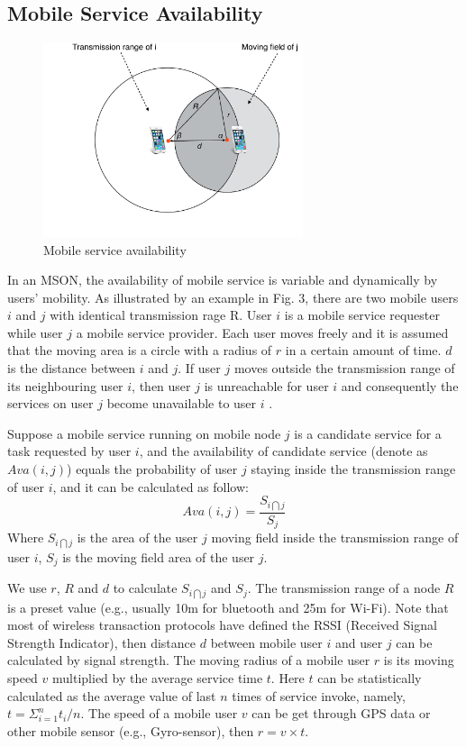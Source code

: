 \documentclass[10pt,journal,compsoc]{IEEEtran}
\begin{document}
\subsection{Mobile Service Availability}
\begin{figure}[!t]
\centering
\includegraphics[width=3in]{./img/pic3.pdf}
\caption{Mobile service availability}
\label{fig_sd}
\end{figure}
In an MSON, the availability of mobile service is variable and dynamically by users' mobility. 
As illustrated by an example in Fig. 3, there are two mobile users $i$ and $j$ with identical transmission rage R. User $i$ is a mobile service requester while user $j$ a mobile service provider. Each user moves freely and it is assumed that the moving area is a circle with a radius of $r$ in a certain amount of time. $d$ is the distance between $i$ and $j$. If user $j$ moves outside the transmission range of its neighbouring user $i$, then user $j$ is unreachable for user $i$ and consequently the services on user $j$ become unavailable to user $i$ \cite{Yang2010}.

Suppose a mobile service running on mobile node $j$ is a candidate service for a task requested by user $i$, and the availability of candidate service (denote as $Ava(i,j)$) equals the probability of user $j$ staying inside the transmission range of user $i$, and it can be calculated as follow: 
\begin{equation}
Ava(i,j) = \frac{S_{i \bigcap j}}{S_j}
\end{equation}
Where $S_{i \bigcap j}$ is the area of the user $j$ moving field inside the transmission range of user $i$, $S_j$ is the moving field area of the user $j$.

We use $r$, $R$ and $d$ to calculate $S_{i \bigcap j}$ and $S_j$. 
The transmission range of a node $R$ is a preset value (e.g., usually 10m for bluetooth and 25m for Wi-Fi). 
Note that most of wireless transaction protocols have defined the RSSI (Received Signal Strength Indicator), then distance $d$ between mobile user $i$ and user $j$ can be calculated by signal strength.  
The moving radius of a mobile user $r$ is its moving speed $v$ multiplied by the average service time $t$. Here $t$ can be statistically calculated as the average value of last $n$ times of service invoke, namely, $t = \Sigma_{i=1}^{n}t_i/n$. The speed of a mobile user $v$ can be get through GPS data or other mobile sensor (e.g., Gyro-sensor), then $r = v \times t$. ​
\end{document}
